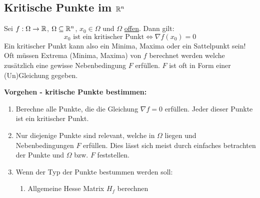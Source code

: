 \subsection{Kritische Punkte im $\mathbb{R}^n$}
Sei $f: \Omega \to \mathbb{R}$, $\Omega \subseteq \mathbb{R}^n$,  $x_0 \in \Omega$ und $\Omega$ \uline{offen}. Dann gilt: 
\[
	x_0 \text{ ist ein kritischer Punkt} \Leftrightarrow \nabla f(x_0) = 0
\]
Ein kritischer Punkt kann also ein Minima, Maxima oder ein Sattelpunkt sein! Oft müssen Extrema (Minima, Maxima) von $f$ berechnet werden welche zusätzlich eine gewisse Nebenbedingung $F$ erfüllen. $F$ ist oft in Form einer (Un)Gleichung 
gegeben. 

\textbf{Vorgehen - kritische Punkte bestimmen:} 
\begin{enumerate}[leftmargin=0.5cm]
	\item Berechne alle Punkte, die die Gleichung $\nabla f = 0$ erfüllen. Jeder dieser Punkte ist ein kritischer Punkt.

	\item Nur diejenige Punkte sind relevant, welche in $\Omega$ liegen und Nebenbedingungen $F$ erfüllen. Dies lässt sich meist durch einfaches betrachten der Punkte und $\Omega$ bzw. $F$ feststellen.

	\item Wenn der Typ der Punkte bestummen werden soll:
	\begin{enumerate}[leftmargin=0.3cm]
		\item Allgemeine Hesse Matrix $H_f$ berechnen


\end{enumerate}
\end{enumerate}

